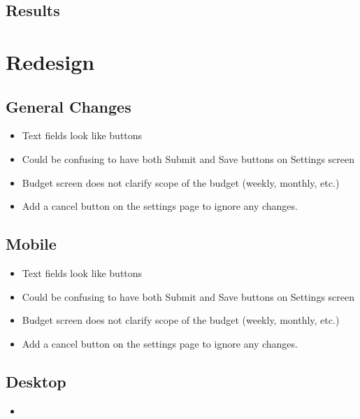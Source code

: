 \documentclass{chi2011}
\begin{document}
    \subsection{Results}
\section{Redesign}
\subsection{General Changes}
    \begin{itemize}
        \item Text fields look like buttons
        \item Could be confusing to have both Submit and Save buttons on Settings screen
        \item Budget screen does not clarify scope of the budget (weekly, monthly, etc.)
        \item Add a cancel button on the settings page to ignore any changes.
    \end{itemize}

\subsection{Mobile}
    \begin{itemize}
        \item Text fields look like buttons
        \item Could be confusing to have both Submit and Save buttons on Settings screen
        \item Budget screen does not clarify scope of the budget (weekly, monthly, etc.)
        \item Add a cancel button on the settings page to ignore any changes.
    \end{itemize}

    \subsection{Desktop}
    \begin{itemize}
        \item 
    \end{itemize}
\end{document}
